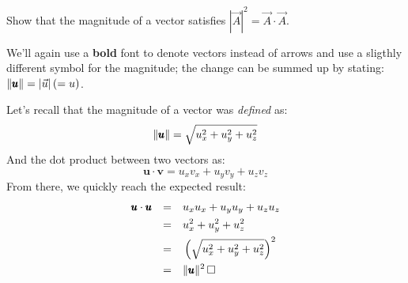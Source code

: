 \documentclass[solutions.tex]{subfiles}
\begin{document}
\maketitle
\begin{exercise} Show that the magnitude of a vector satisfies
$|\vec{A}|^2 = \vec{A}\cdot\vec{A}$.
\end{exercise}
\begin{remark} We'll again use a \textbf{bold} font to denote
vectors instead of arrows and use a sligthly different symbol
for the magnitude; the change can be summed up by stating:
$\lVert \pmb{u} \rVert = |\vec{u}|\, (= u)$.
\end{remark}
Let's recall that the magnitude of a vector was \textit{defined} as:
\[
	\lVert \pmb{u} \rVert = \sqrt{u_x^2 + u_y^2 + u_z^2}
\]
And the dot product between two vectors as:
\[
	\bm{u}\cdot\bm{v} = u_xv_x + u_yv_y + u_zv_z
\]
From there, we quickly reach the expected result:
\begin{equation*} \begin{aligned}
	\pmb{u}\cdot\pmb{u} &&=\quad& u_xu_x + u_yu_y + u_zu_z \\
	~ &&=\quad& u_x^2 + u_y^2 + u_z^2 \\
	~ &&=\quad& \left(\sqrt{u_x^2 + u_y^2 + u_z^2}\right)^2 \\
	~ &&=\quad& \lVert \pmb{u} \rVert^2 \,\Box
\end{aligned} \end{equation*}
\end{document}
